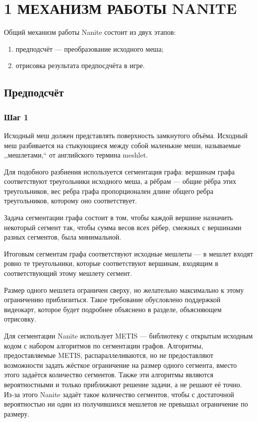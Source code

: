 \clearpage
\section{1 МЕХАНИЗМ РАБОТЫ NANITE}
Общий механизм работы Nanite состоит из двух этапов:
\begin{enumerate}
    \item предподсчёт --- преобразование исходного меша;
    \item отрисовка результата предпосдчёта в игре.
\end{enumerate}

\subsection*{Предподсчёт}
\subsubsection*{Шаг 1}
Исходный меш должен представлять поверхность замкнутого объёма.
Исходный меш разбивается на стыкующиеся между собой маленькие меши, называемые ,,мешлетами,`` от английского термина meshlet.

Для подобного разбиения используется сегментация графа: вершинам графа соответствуют треугольники исходного меша, а рёбрам --- общие рёбра этих треугольников, вес ребра графа пропорционален длине общего ребра треугольников, которому оно соответствует.

Задача сегментации графа состоит в том, чтобы каждой вершине назначить некоторый сегмент так, чтобы сумма весов всех рёбер, смежных с вершинами разных сегментов, была минимальной.

Итоговым сегментам графа соответствуют исходные мешлеты --- в мешлет входят ровно те треугольники, которые соответствуют вершинам, входящим в соответствующий этому мешлету сегмент.

Размер одного мешлета ограничен сверху, но желательно максимально к этому ограничению приблизиться.
Такое требование обусловлено поддержкой видеокарт, которое будет подробнее объяснено в разделе, объясняющем отрисовку.

Для сегментации Nanite использует METIS --- библиотеку с открытым исходным кодом с набором алгоритмов по сегментации графов.
Алгоритмы, предоставляемые METIS, распараллеливаются, но не предоставляют возможности задать жёсткое ограничение на размер одного сегмента, вместо этого задаётся количество сегментов.
Также эти алгоритмы являются вероятностными и только приближают решение задачи, а не решают её точно.
Из-за этого Nanite задаёт такое количество сегментов, чтобы с достаточной вероятностью ни один из получившихся мешлетов не превышал ограничение по размеру.

